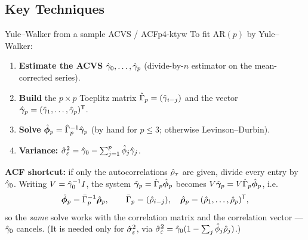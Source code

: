 \subsection{Key Techniques}

\begin{keytech}{Yule--Walker from a sample ACVS / ACF}{p4-ktyw}
To fit AR$(p)$ by Yule--Walker:
\begin{enumerate}
  \item \textbf{Estimate the ACVS} $\hat{\gamma}_0,\dots,\hat{\gamma}_p$ (divide-by-$n$
        estimator on the mean-corrected series).
  \item \textbf{Build} the $p\times p$ Toeplitz matrix
        $\hat\Gamma_p=(\hat{\gamma}_{i-j})$ and the vector
        $\hat{\boldsymbol{\gamma}}_p=(\hat{\gamma}_1,\dots,\hat{\gamma}_p)^{\mathsf{T}}$.
  \item \textbf{Solve} $\hat{\boldsymbol\phi}_p=\hat\Gamma_p^{-1}\hat{\boldsymbol{\gamma}}_p$
        (by hand for $p\le3$; otherwise Levinson--Durbin).
  \item \textbf{Variance:}
        $\hat\sigma_\varepsilon^2=\hat{\gamma}_0-\sum_{j=1}^p\hat\phi_j\hat{\gamma}_j$.
\end{enumerate}
\textbf{ACF shortcut:} if only the autocorrelations $\hat{\rho}_\tau$ are given,
divide every entry by $\hat{\gamma}_0$. Writing $V=\hat{\gamma}_0^{-1}I$, the system
$\hat{\boldsymbol{\gamma}}_p=\hat\Gamma_p\hat{\boldsymbol\phi}_p$ becomes
$V\hat{\boldsymbol{\gamma}}_p=V\hat\Gamma_p\hat{\boldsymbol\phi}_p$, i.e.\
\[
\hat{\boldsymbol\phi}_p=\bar\Gamma_p^{-1}\hat{\boldsymbol{\rho}}_p,
\qquad
\bar\Gamma_p=(\hat{\rho}_{i-j}),\quad
\hat{\boldsymbol{\rho}}_p=(\hat{\rho}_1,\dots,\hat{\rho}_p)^{\mathsf{T}},
\]
so the \emph{same} solve works with the correlation matrix and the correlation
vector --- $\hat{\gamma}_0$ cancels. (It is needed only for $\hat\sigma_\varepsilon^2$,
via $\hat\sigma_\varepsilon^2=\hat{\gamma}_0(1-\sum_j\hat\phi_j\hat{\rho}_j)$.)
\end{keytech}

